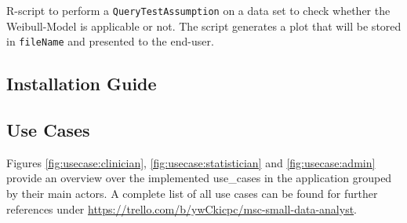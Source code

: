 \begin{listing}[hbtp]
	\caption{R-script to perform a \texttt{QueryTestAssumption} on a data set to check whether the Weibull-Model is applicable or not. The script generates a plot that will be stored in \texttt{fileName} and presented to the end-user.}
	\label{lst:rcode}
\end{listing}


\subsection{Installation Guide}
\label{app:installation}


\subsection{Use Cases}
\label{app:use_cases}

Figures \ref{fig:usecase:clinician}, \ref{fig:usecase:statistician} and \ref{fig:usecase:admin} provide an overview over the implemented \glspl{use_case} in the application grouped by their main actors. A complete list of all use cases can be found for further references under \href{https://trello.com/b/ywCkicpc/msc-small-data-analyst}{https://trello.com/b/ywCkicpc/msc-small-data-analyst}.

